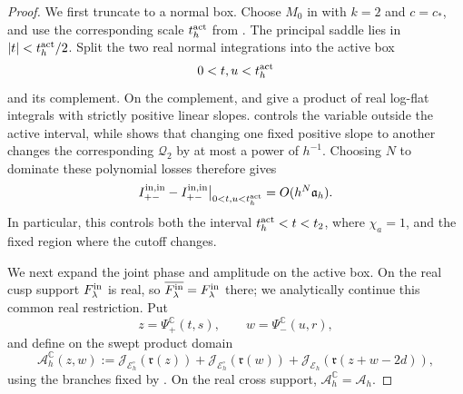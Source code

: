 \documentclass[11pt]{article}
\newcommand{\C}{\mathbb C}
\newcommand{\cA}{\mathcal A}
\newcommand{\cE}{\mathcal E}
\newcommand{\cJ}{\mathcal J}
\begin{document}
\begin{proof}
We first truncate to a normal box.  Choose $M_0$ in
 with $k=2$ and $c=c_*$, and use the
corresponding scale $t_h^{\rm act}$ from .
The principal saddle lies in $|t|<t_h^{\rm act}/2$.  Split the two real
normal integrations into the active box
\[
0<t,u<t_h^{\rm act}
\] 
and its complement.  On the complement,
 and
 give a product of real log-flat integrals with
strictly positive linear slopes.   controls
the variable outside the active interval, while  shows that changing one fixed
positive slope to another changes the corresponding $\mathcal Q_2$ by at
most a power of $h^{-1}$.
Choosing $N$ to dominate these polynomial losses
therefore gives
\begin{equation}\label{eq:active-box-tail}
 I_{+-}^{\rm in,in}
 -I_{+-}^{\rm in,in}\big|_{0<t,u<t_h^{\rm act}}
 =O(h^N\mathfrak a_h).
\end{equation}
In particular, this controls both the interval
$t_h^{\rm act}<t<t_2$, where $\chi_a=1$, and the fixed region where the
cutoff changes.

We next expand the joint phase and amplitude on the active box.  On the real
cusp support $F_\lambda^{\rm in}$ is real, so
$\overline{F_\lambda^{\rm in}}=F_\lambda^{\rm in}$ there; we analytically
continue this common real restriction.  Put
\[
 z=\Psi_+^\C(t,s),\qquad w=\Psi_-^\C(u,r),
\]
and define on the swept product domain
\begin{equation}\label{eq:complex-total-action}
 \cA_h^\C(z,w)
 :=\cJ_{\cE_h^\circ}(\mathfrak r(z))
 +\cJ_{\cE_h^\circ}(\mathfrak r(w))
 +\cJ_{\cE_h}(\mathfrak r(z+w-2d)),
\end{equation}
using the branches fixed by .  On the real
cross support, $\cA_h^\C=\cA_h$.


\end{proof}
\end{document}
